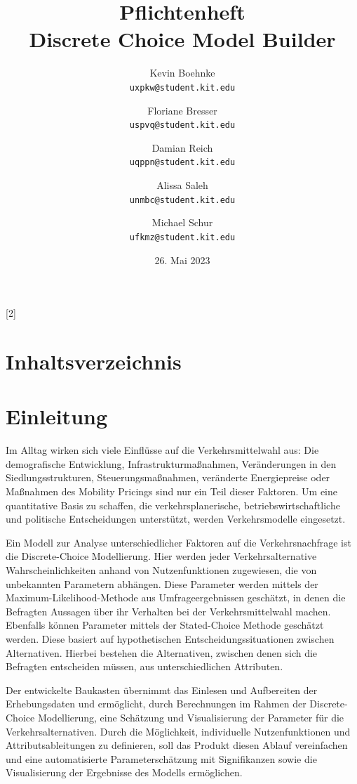 \documentclass{article}
\title{Pflichtenheft \\ \large Discrete Choice Model Builder}
\author{Kevin Boehnke \\ \texttt{uxpkw@student.kit.edu}
\and Floriane Bresser \\ \texttt{uspvq@student.kit.edu}
\and Damian Reich \\ \texttt{uqppn@student.kit.edu}
\and Alissa Saleh \\ \texttt{unmbc@student.kit.edu}
\and Michael Schur \\ \texttt{ufkmz@student.kit.edu}}
\date{26. Mai 2023}
\begin{document}
\clearpage\maketitle\thispagestyle{empty}
\newpage
\clearpage
\startcontents[maintableofcontents]
[2]{\section*{Inhaltsverzeichnis}}
\thispagestyle{empty}
\newpage
{}


\section{Einleitung}

Im Alltag wirken sich viele Einflüsse auf die Verkehrsmittelwahl aus: Die demografische Entwicklung, Infrastrukturmaßnahmen, Veränderungen in den Siedlungsstrukturen, Steuerungsmaßnahmen, veränderte Energiepreise oder Maßnahmen des Mobility Pricings sind nur ein Teil dieser Faktoren. Um eine quantitative Basis zu schaffen, die verkehrsplanerische, betriebswirtschaftliche und politische Entscheidungen unterstützt, werden Verkehrsmodelle eingesetzt.\newline

Ein Modell zur Analyse unterschiedlicher Faktoren auf die Verkehrsnachfrage ist die Discrete-Choice Modellierung. Hier werden jeder Verkehrsalternative Wahrscheinlichkeiten anhand von Nutzenfunktionen zugewiesen, die von unbekannten Parametern abhängen. Diese Parameter werden mittels der Maximum-Likelihood-Methode aus Umfrageergebnissen geschätzt, in denen die Befragten Aussagen über ihr Verhalten bei der Verkehrsmittelwahl machen. Ebenfalls können Parameter mittels der Stated-Choice Methode geschätzt werden. Diese basiert auf hypothetischen Entscheidungssituationen zwischen Alternativen. Hierbei bestehen die Alternativen, zwischen denen sich die Befragten entscheiden müssen, aus unterschiedlichen Attributen. %
\newline

Der entwickelte Baukasten übernimmt das Einlesen und Aufbereiten der Erhebungsdaten und ermöglicht, durch Berechnungen im Rahmen der Discrete-Choice Modellierung, eine Schätzung und Visualisierung der Parameter für die Verkehrsalternativen. Durch die Möglichkeit, individuelle Nutzenfunktionen und Attributsableitungen zu definieren, soll das Produkt diesen Ablauf vereinfachen und eine automatisierte Parameterschätzung mit Signifikanzen sowie die Visualisierung der Ergebnisse des Modells ermöglichen.
\end{document}
